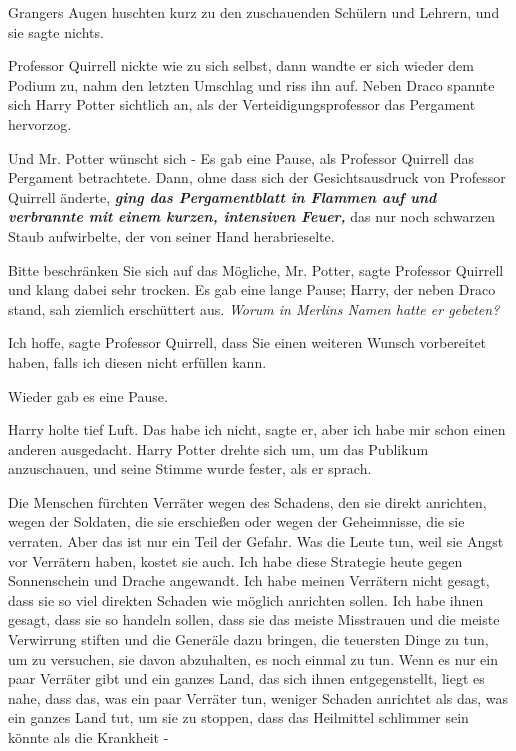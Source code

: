 Grangers Augen huschten kurz zu den zuschauenden Schülern und Lehrern, und sie
sagte nichts.

Professor Quirrell nickte wie zu sich selbst, dann wandte er sich wieder dem
Podium zu, nahm den letzten Umschlag und riss ihn auf. Neben Draco spannte sich
Harry Potter sichtlich an, als der Verteidigungsprofessor das Pergament
hervorzog.

\glqq{}Und Mr. Potter wünscht sich -\grqq{} Es gab eine Pause, als Professor Quirrell
das Pergament betrachtete. Dann, ohne dass sich der Gesichtsausdruck von
Professor Quirrell änderte,\textbf{\emph{ ging das Pergamentblatt in Flammen auf
und verbrannte mit einem kurzen, intensiven Feuer,}} das nur noch schwarzen
Staub aufwirbelte, der von seiner Hand herabrieselte.

\glqq{}Bitte beschränken Sie sich auf das Mögliche, Mr. Potter\grqq{}, sagte
Professor Quirrell und klang dabei sehr trocken. Es gab eine lange Pause; Harry,
der neben Draco stand, sah ziemlich erschüttert aus. \emph{Worum in Merlins
Namen hatte er gebeten?}

\glqq{}Ich hoffe\grqq{}, sagte Professor Quirrell, \glqq{}dass Sie einen weiteren
Wunsch vorbereitet haben, falls ich diesen nicht erfüllen kann.\grqq{}

Wieder gab es eine Pause.

Harry holte tief Luft. \glqq{}Das habe ich nicht\grqq{}, sagte er, \glqq{}aber ich
habe mir schon einen anderen ausgedacht.\grqq{} Harry Potter drehte sich um, um
das Publikum anzuschauen, und seine Stimme wurde fester, als er sprach.

\glqq{}Die Menschen fürchten Verräter wegen des Schadens, den sie direkt
anrichten, wegen der Soldaten, die sie erschießen oder wegen der Geheimnisse,
die sie verraten. Aber das ist nur ein Teil der Gefahr. Was die Leute tun, weil
sie Angst vor Verrätern haben, kostet sie auch. Ich habe diese Strategie heute
gegen Sonnenschein und Drache angewandt. Ich habe meinen Verrätern nicht gesagt,
dass sie so viel direkten Schaden wie möglich anrichten sollen. Ich habe ihnen
gesagt, dass sie so handeln sollen, dass sie das meiste Misstrauen und die
meiste Verwirrung stiften und die Generäle dazu bringen, die teuersten Dinge zu
tun, um zu versuchen, sie davon abzuhalten, es noch einmal zu tun. Wenn es nur
ein paar Verräter gibt und ein ganzes Land, das sich ihnen entgegenstellt, liegt
es nahe, dass das, was ein paar Verräter tun, weniger Schaden anrichtet als das,
was ein ganzes Land tut, um sie zu stoppen, dass das Heilmittel schlimmer sein
könnte als die Krankheit -\grqq{}

